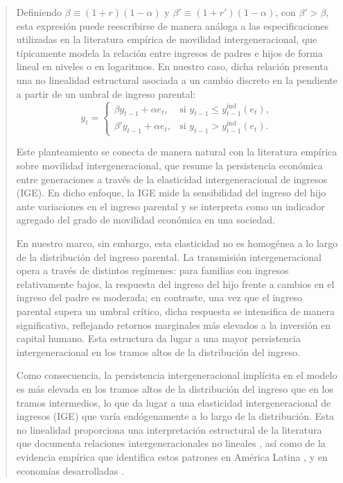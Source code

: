 \documentclass[12pt]{article}
\begin{document}
\begin{abstract}
Definiendo $\beta \equiv (1+r)(1-\alpha)$ y $\beta' \equiv (1+r')(1-\alpha)$, con $\beta' > \beta$, esta expresión puede reescribirse de manera análoga a las especificaciones utilizadas en la literatura empírica de movilidad intergeneracional, que típicamente modela la relación entre ingresos de padres e hijos de forma lineal en niveles o en logaritmos. En nuestro caso, dicha relación presenta una no linealidad estructural asociada a un cambio discreto en la pendiente a partir de un umbral de ingreso parental:
\[
y_t
=
\begin{cases}
\beta y_{t-1}+\alpha e_t,
& \text{si } y_{t-1}\leq y_{t-1}^{\text{ind}}(e_t), \\[0.4em]
\beta' y_{t-1}+\alpha e_t,
& \text{si } y_{t-1}> y_{t-1}^{\text{ind}}(e_t).
\end{cases}
\]

Este planteamiento se conecta de manera natural con la literatura empírica sobre movilidad intergeneracional, que resume la persistencia económica entre generaciones a través de la elasticidad intergeneracional de ingresos (IGE). En dicho enfoque, la IGE mide la sensibilidad del ingreso del hijo ante variaciones en el ingreso parental y se interpreta como un indicador agregado del grado de movilidad económica en una sociedad.

En nuestro marco, sin embargo, esta elasticidad no es homogénea a lo largo de la distribución del ingreso parental. La transmisión intergeneracional opera a través de distintos regímenes: para familias con ingresos relativamente bajos, la respuesta del ingreso del hijo frente a cambios en el ingreso del padre es moderada; en contraste, una vez que el ingreso parental supera un umbral crítico, dicha respuesta se intensifica de manera significativa, reflejando retornos marginales más elevados a la inversión en capital humano. Esta estructura da lugar a una mayor persistencia intergeneracional en los tramos altos de la distribución del ingreso.


Como consecuencia, la persistencia intergeneracional implícita en el modelo es más elevada en los tramos altos de la distribución del ingreso que en los tramos intermedios, lo que da lugar a una elasticidad intergeneracional de ingresos (IGE) que varía endógenamente a lo largo de la distribución. Esta no linealidad proporciona una interpretación estructural de la literatura que documenta relaciones intergeneracionales no lineales \parencite{Black_2011,Durlauf_2018,Becker_2018}, así como de la evidencia empírica que identifica estos patrones en América Latina \parencite{Leites_2022,Cortes_2024}, y en economías desarrolladas \parencite{Bratsberg_2007,Berritela_2016,Gregg_2019}.


\end{abstract}
\end{document}
